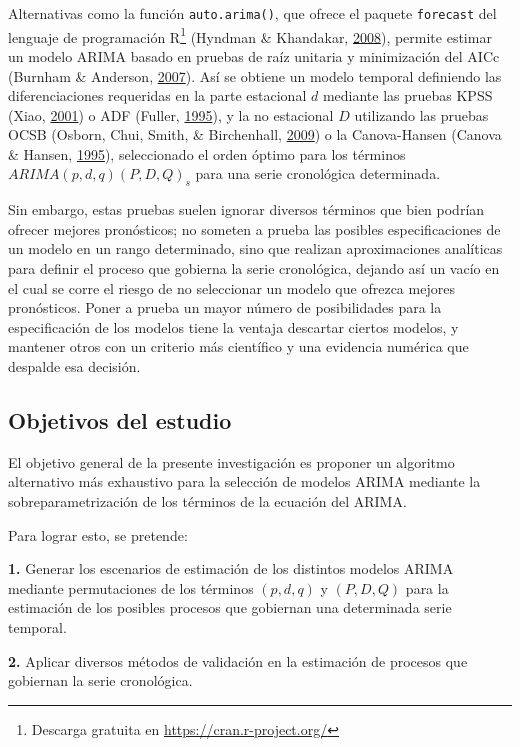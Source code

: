 \documentclass[
]{article}
\begin{document}
Alternativas como la función \texttt{auto.arima()}, que ofrece el
paquete \texttt{forecast} del lenguaje de programación R\footnote{Descarga
  gratuita en \url{https://cran.r-project.org/}} (Hyndman \& Khandakar,
\protect\hyperlink{ref-auto.arima}{2008}), permite estimar un modelo
ARIMA basado en pruebas de raíz unitaria y minimización del AICc
(Burnham \& Anderson, \protect\hyperlink{ref-burnham2007model}{2007}).
Así se obtiene un modelo temporal definiendo las diferenciaciones
requeridas en la parte estacional \(d\) mediante las pruebas KPSS (Xiao,
\protect\hyperlink{ref-doi:10.1111ux2f1467-9892.00213}{2001}) o ADF
(Fuller, \protect\hyperlink{ref-fuller1995introduction}{1995}), y la no
estacional \(D\) utilizando las pruebas OCSB (Osborn, Chui, Smith, \&
Birchenhall, \protect\hyperlink{ref-Osborn2009SEASONALITYAT}{2009}) o la
Canova-Hansen (Canova \& Hansen,
\protect\hyperlink{ref-10.2307ux2f1392184}{1995}), seleccionado el orden
óptimo para los términos \(ARIMA(p, d, q)(P, D, Q)_s\) para una serie
cronológica determinada.

Sin embargo, estas pruebas suelen ignorar diversos términos que bien
podrían ofrecer mejores pronósticos; no someten a prueba las posibles
especificaciones de un modelo en un rango determinado, sino que realizan
aproximaciones analíticas para definir el proceso que gobierna la serie
cronológica, dejando así un vacío en el cual se corre el riesgo de no
seleccionar un modelo que ofrezca mejores pronósticos. Poner a prueba un
mayor número de posibilidades para la especificación de los modelos
tiene la ventaja descartar ciertos modelos, y mantener otros con un
criterio más científico y una evidencia numérica que despalde esa
decisión.

\subsection{Objetivos del estudio}

El objetivo general de la presente investigación es proponer un
algoritmo alternativo más exhaustivo para la selección de modelos ARIMA
mediante la sobreparametrización de los términos de la ecuación del
ARIMA.

Para lograr esto, se pretende:

\textbf{1.} Generar los escenarios de estimación de los distintos
modelos ARIMA mediante permutaciones de los términos \((p,d,q)\) y
\((P,D,Q)\) para la estimación de los posibles procesos que gobiernan
una determinada serie temporal.

\textbf{2.} Aplicar diversos métodos de validación en la estimación de
procesos que gobiernan la serie cronológica.
\end{document}
